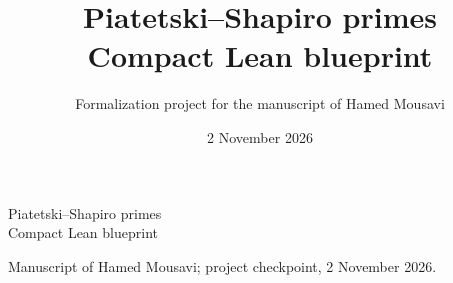 
\newif\ifDetailed\Detailedfalse
\title{Piatetski--Shapiro primes\\Compact Lean blueprint}
\author{Formalization project for the manuscript of Hamed Mousavi}
\date{2 November 2026}

{\LARGE Piatetski--Shapiro primes\\Compact Lean blueprint\par}
\medskip
{\small Manuscript of Hamed Mousavi; project checkpoint, 2 November 2026.\par}
\medskip


